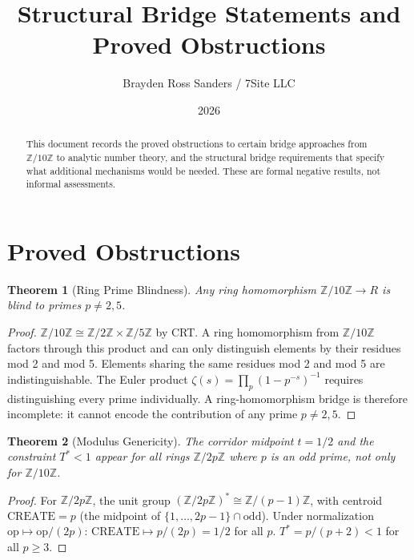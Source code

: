 \documentclass{amsart}
\title{Structural Bridge Statements and Proved Obstructions}
\author{Brayden Ross Sanders / 7Site LLC}
\date{2026}
\newtheorem{theorem}{Theorem}
\begin{document}
\maketitle

\begin{abstract}
This document records the proved obstructions to certain bridge approaches
from $\mathbb{Z}/10\mathbb{Z}$ to analytic number theory,
and the structural bridge requirements that specify what additional mechanisms
would be needed. These are formal negative results, not informal assessments.
\end{abstract}

\section{Proved Obstructions}

\begin{theorem}[Ring Prime Blindness]
Any ring homomorphism $\mathbb{Z}/10\mathbb{Z} \to R$ is blind to primes $p \neq 2, 5$.
\end{theorem}

\begin{proof}
$\mathbb{Z}/10\mathbb{Z} \cong \mathbb{Z}/2\mathbb{Z} \times \mathbb{Z}/5\mathbb{Z}$ by CRT.
A ring homomorphism from $\mathbb{Z}/10\mathbb{Z}$ factors through this product
and can only distinguish elements by their residues mod 2 and mod 5.
Elements sharing the same residues mod 2 and mod 5 are indistinguishable.
The Euler product $\zeta(s) = \prod_p (1-p^{-s})^{-1}$ requires distinguishing
every prime individually. A ring-homomorphism bridge is therefore incomplete:
it cannot encode the contribution of any prime $p \neq 2, 5$.
\end{proof}

\begin{theorem}[Modulus Genericity]
The corridor midpoint $t = 1/2$ and the constraint $T^* < 1$ appear for all rings
$\mathbb{Z}/2p\mathbb{Z}$ where $p$ is an odd prime, not only for $\mathbb{Z}/10\mathbb{Z}$.
\end{theorem}

\begin{proof}
For $\mathbb{Z}/2p\mathbb{Z}$, the unit group $(\mathbb{Z}/2p\mathbb{Z})^* \cong \mathbb{Z}/(p-1)\mathbb{Z}$,
with centroid $\mathrm{CREATE} = p$ (the midpoint of $\{1,\ldots,2p-1\} \cap \mathrm{odd}$).
Under normalization $\mathrm{op} \mapsto \mathrm{op}/(2p)$:
$\mathrm{CREATE} \mapsto p/(2p) = 1/2$ for all $p$.
$T^* = p/(p+2) < 1$ for all $p \geq 3$.
\end{proof}
\end{document}
